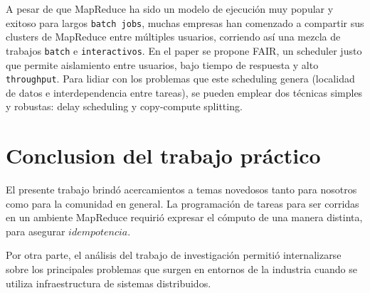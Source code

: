 \documentclass[11pt, a4paper, twoside]{article}
\begin{document}
A pesar de que MapReduce ha sido un modelo de ejecución muy popular y exitoso
para largos \texttt{batch jobs}, muchas empresas han comenzado a compartir
sus clusters de MapReduce entre múltiples usuarios, corriendo así una mezcla
de trabajos \texttt{batch} e \texttt{interactivos}. En el paper se propone
FAIR, un scheduler justo que permite aislamiento entre usuarios, bajo tiempo
de respuesta y alto \texttt{throughput}. Para lidiar con los problemas que este
scheduling genera (localidad de datos e interdependencia entre tareas),
se pueden emplear dos técnicas simples y robustas: delay scheduling y
copy-compute splitting.

\clearpage
\section*{Conclusion del trabajo práctico}
El presente trabajo brindó acercamientos a temas novedosos tanto para nosotros como para la comunidad en general. La programación de tareas para ser corridas en un ambiente MapReduce requirió expresar el cómputo de una manera distinta, para asegurar $idempotencia$.

Por otra parte, el análisis del trabajo de investigación permitió internalizarse sobre los principales problemas que surgen en entornos de la industria cuando se utiliza infraestructura de sistemas distribuidos.
\end{document}
